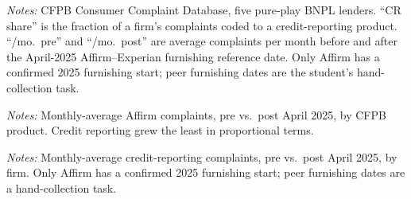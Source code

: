 \documentclass[12pt]{article}
\begin{document}
\FloatBarrier
\newpage
\begin{table}[htbp]\centering
\begin{threeparttable}
\caption{Sample composition: BNPL complaints by firm, 2022--2026}\label{tab:sumstats}\small

\begin{tablenotes}\small\item \textit{Notes:} CFPB Consumer Complaint Database, five pure-play
BNPL lenders. ``CR share'' is the fraction of a firm's complaints coded to a credit-reporting
product. ``/mo.\ pre'' and ``/mo.\ post'' are average complaints per month before and after the
April-2025 Affirm--Experian furnishing reference date. Only Affirm has a confirmed 2025
furnishing start; peer furnishing dates are the student's hand-collection task.
\end{tablenotes}
\end{threeparttable}
\end{table}

\begin{table}[htbp]\centering
\begin{threeparttable}
\caption{Affirm complaint composition surged across all products}\label{tab:comp}\small

\begin{tablenotes}\small\item \textit{Notes:} Monthly-average Affirm complaints, pre vs.\ post
April 2025, by CFPB product. Credit reporting grew the least in proportional terms.
\end{tablenotes}
\end{threeparttable}
\end{table}

\begin{table}[htbp]\centering
\begin{threeparttable}
\caption{Credit-reporting complaint growth by firm: the furnisher is not special}\label{tab:firm}\small

\begin{tablenotes}\small\item \textit{Notes:} Monthly-average credit-reporting complaints, pre
vs.\ post April 2025, by firm. Only Affirm has a confirmed 2025 furnishing start; peer
furnishing dates are a hand-collection task.
\end{tablenotes}
\end{threeparttable}
\end{table}
\end{document}
